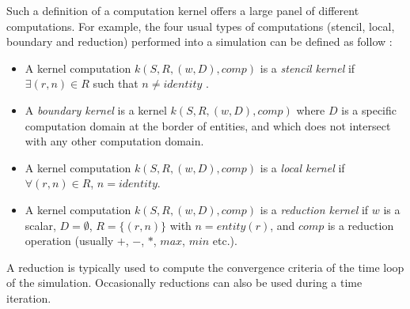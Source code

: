 Such a definition of a computation kernel offers a large panel of different computations. For example, the four usual types of computations (stencil, local, boundary and reduction) performed into a simulation can be defined as follow :
\begin{itemize}
\item A kernel computation $k(S,R,(w,D),comp)$ is a \emph{stencil kernel} if $\exists (r,n) \in R$ such that $n \neq identity$ .
\item A \emph{boundary kernel} is a kernel $k(S,R,(w,D),comp)$ where $D$ is a specific computation domain at the border of entities, and which does not intersect with any other computation domain.
\item A kernel computation $k(S,R,(w,D),comp)$ is a \emph{local kernel} if $\forall (r,n) \in R$, $n = identity$.
\item A kernel computation $k(S,R,(w,D),comp)$ is a \emph{reduction kernel} if $w$ is a scalar, $D=\emptyset$, $R=\{(r,n)\}$ with $n=entity(r)$, and $comp$ is a reduction operation (usually $+$, $-$, $*$, $max$, $min$ etc.).
\end{itemize}





A reduction is typically used to compute the convergence criteria of the time loop of the simulation. Occasionally reductions can also be used during a time iteration.

